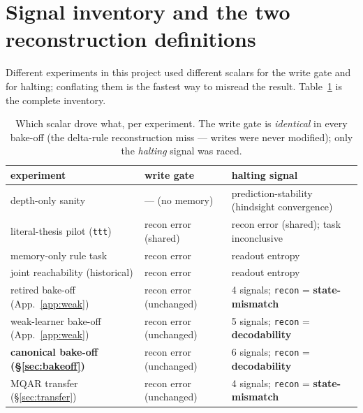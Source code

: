 \documentclass{article}
\newcommand{\sig}[1]{\texttt{#1}}
\begin{document}
\appendix

\section{Signal inventory and the two reconstruction definitions}\label{app:signals}

Different experiments in this project used different scalars for the write gate
and for halting; conflating them is the fastest way to misread the result.
Table~\ref{tab:inventory} is the complete inventory.

\begin{table}[h]
\caption{Which scalar drove what, per experiment. The write gate is
\emph{identical} in every bake-off (the delta-rule reconstruction miss ---
writes were never modified); only the \emph{halting} signal was raced.}
\label{tab:inventory}
\centering
\small
\begin{tabular}{lll}
\toprule
experiment & write gate & halting signal \\
\midrule
depth-only sanity & --- (no memory) & prediction-stability (hindsight convergence) \\
literal-thesis pilot (\sig{ttt}) & recon error (shared) & recon error (shared); task inconclusive \\
memory-only rule task & recon error & readout entropy \\
joint reachability (historical) & recon error & readout entropy \\
retired bake-off (App.~\ref{app:weak}) & recon error (unchanged) & 4 signals; \sig{recon} = \textbf{state-mismatch} \\
weak-learner bake-off (App.~\ref{app:weak}) & recon error (unchanged) & 5 signals; \sig{recon} = \textbf{decodability} \\
\textbf{canonical bake-off (\S\ref{sec:bakeoff})} & recon error (unchanged) & 6 signals; \sig{recon} = \textbf{decodability} \\
MQAR transfer (\S\ref{sec:transfer}) & recon error (unchanged) & 4 signals; \sig{recon} = \textbf{state-mismatch} \\
\bottomrule
\end{tabular}
\end{table}
\end{document}
